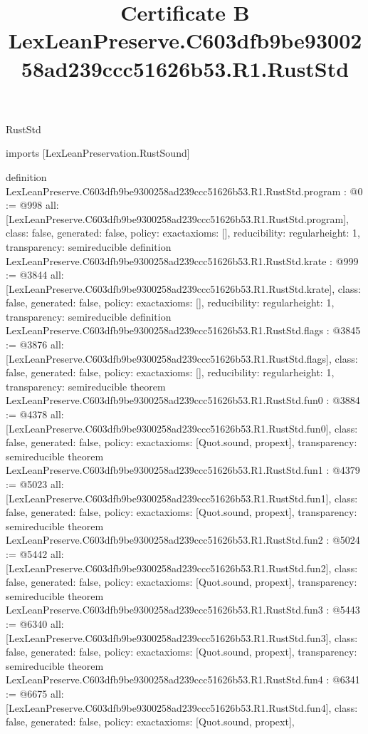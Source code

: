 \begin{lexlean}{RustStd}
\title{Certificate B LexLeanPreserve.C603dfb9be9300258ad239ccc51626b53.R1.RustStd}
\begin{coremodule}
imports [LexLeanPreservation.RustSound]

definition LexLeanPreserve.C603dfb9be9300258ad239ccc51626b53.R1.RustStd.program : @0 := @998 {
  all: [LexLeanPreserve.C603dfb9be9300258ad239ccc51626b53.R1.RustStd.program],
  class: false,
  generated: false,
  policy: exact{axioms: []},
  reducibility: regular{height: 1},
  transparency: semireducible
}
definition LexLeanPreserve.C603dfb9be9300258ad239ccc51626b53.R1.RustStd.krate : @999 := @3844 {
  all: [LexLeanPreserve.C603dfb9be9300258ad239ccc51626b53.R1.RustStd.krate],
  class: false,
  generated: false,
  policy: exact{axioms: []},
  reducibility: regular{height: 1},
  transparency: semireducible
}
definition LexLeanPreserve.C603dfb9be9300258ad239ccc51626b53.R1.RustStd.flags : @3845 := @3876 {
  all: [LexLeanPreserve.C603dfb9be9300258ad239ccc51626b53.R1.RustStd.flags],
  class: false,
  generated: false,
  policy: exact{axioms: []},
  reducibility: regular{height: 1},
  transparency: semireducible
}
theorem LexLeanPreserve.C603dfb9be9300258ad239ccc51626b53.R1.RustStd.fun0 : @3884 := @4378 {
  all: [LexLeanPreserve.C603dfb9be9300258ad239ccc51626b53.R1.RustStd.fun0],
  class: false,
  generated: false,
  policy: exact{axioms: [Quot.sound, propext]},
  transparency: semireducible
}
theorem LexLeanPreserve.C603dfb9be9300258ad239ccc51626b53.R1.RustStd.fun1 : @4379 := @5023 {
  all: [LexLeanPreserve.C603dfb9be9300258ad239ccc51626b53.R1.RustStd.fun1],
  class: false,
  generated: false,
  policy: exact{axioms: [Quot.sound, propext]},
  transparency: semireducible
}
theorem LexLeanPreserve.C603dfb9be9300258ad239ccc51626b53.R1.RustStd.fun2 : @5024 := @5442 {
  all: [LexLeanPreserve.C603dfb9be9300258ad239ccc51626b53.R1.RustStd.fun2],
  class: false,
  generated: false,
  policy: exact{axioms: [Quot.sound, propext]},
  transparency: semireducible
}
theorem LexLeanPreserve.C603dfb9be9300258ad239ccc51626b53.R1.RustStd.fun3 : @5443 := @6340 {
  all: [LexLeanPreserve.C603dfb9be9300258ad239ccc51626b53.R1.RustStd.fun3],
  class: false,
  generated: false,
  policy: exact{axioms: [Quot.sound, propext]},
  transparency: semireducible
}
theorem LexLeanPreserve.C603dfb9be9300258ad239ccc51626b53.R1.RustStd.fun4 : @6341 := @6675 {
  all: [LexLeanPreserve.C603dfb9be9300258ad239ccc51626b53.R1.RustStd.fun4],
  class: false,
  generated: false,
  policy: exact{axioms: [Quot.sound, propext]},
}
\end{coremodule}
\end{lexlean}
